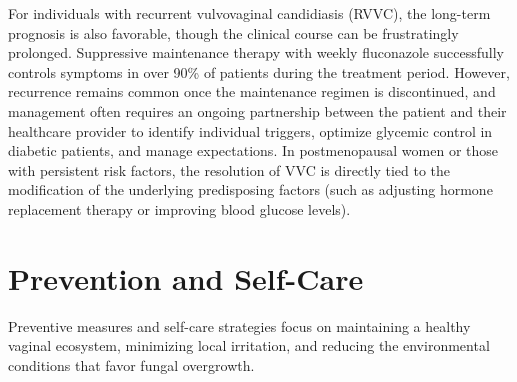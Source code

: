 For individuals with recurrent vulvovaginal candidiasis (RVVC), the long-term prognosis is also favorable, though the clinical course can be frustratingly prolonged. Suppressive maintenance therapy with weekly fluconazole successfully controls symptoms in over 90\% of patients during the treatment period. However, recurrence remains common once the maintenance regimen is discontinued, and management often requires an ongoing partnership between the patient and their healthcare provider to identify individual triggers, optimize glycemic control in diabetic patients, and manage expectations. In postmenopausal women or those with persistent risk factors, the resolution of VVC is directly tied to the modification of the underlying predisposing factors (such as adjusting hormone replacement therapy or improving blood glucose levels).

\section*{Prevention and Self-Care}
Preventive measures and self-care strategies focus on maintaining a healthy vaginal ecosystem, minimizing local irritation, and reducing the environmental conditions that favor fungal overgrowth.

